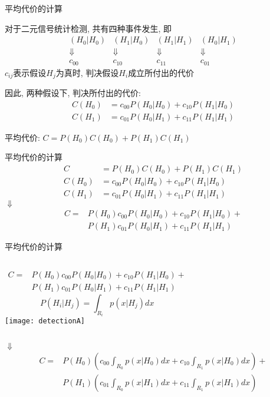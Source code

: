 \begin{frame}{平均代价的计算}
\begin{block}{对于二元信号统计检测, 共有四种事件发生, 即}
	$$
	\begin{array}{cccc}
	(H_0|H_0) & (H_1|H_0) & (H_1|H_1) & (H_0|H_1)\\
	\Downarrow & \Downarrow & \Downarrow & \Downarrow\\
	c_{00} & c_{10} & c_{11} & c_{01}
	\end{array}
	$$
	$c_{ij}$表示假设$H_j$为真时, 判决假设$H_i$成立所付出的代价
\end{block}
\begin{block}{因此, 两种假设下, 判决所付出的代价: }
   \begin{align*}
   C(H_0)&=c_{00}P(H_0|H_0)+c_{10}P(H_1|H_0)\\
   C(H_1)&=c_{01}P(H_0|H_1)+c_{11}P(H_1|H_1)
   \end{align*}
\end{block}
 平均代价: $C=P(H_0)C(H_0)+P(H_1)C(H_1)$
\end{frame}

\begin{frame}{平均代价的计算}
\begin{align*}
C&=P(H_0)C(H_0)+P(H_1)C(H_1)\\
C(H_0)&=c_{00}P(H_0|H_0)+c_{10}P(H_1|H_0)\\
C(H_1)&=c_{01}P(H_0|H_1)+c_{11}P(H_1|H_1)
\end{align*}
\centering $\Downarrow$
\begin{align*}
C=&P(H_0)c_{00}P(H_0|H_0)+c_{10}P(H_1|H_0)+\\
&P(H_1)c_{01}P(H_0|H_1)+c_{11}P(H_1|H_1)
\end{align*}
\end{frame}

\begin{frame}[shrink]{平均代价的计算}
\begin{columns}
	\begin{align*}
	C=&P(H_0)c_{00}P(H_0|H_0)+c_{10}P(H_1|H_0)+\\
	&P(H_1)c_{01}P(H_0|H_1)+c_{11}P(H_1|H_1)
	\end{align*}
	\[ P(H_i|H_j)=\int_{R_i}p(x|H_j)dx\]
	\texttt{[image: detectionA]}
\end{columns}

\medskip
\centering $\Downarrow$
\begin{align*}
C=&P(H_0)\left(c_{00}\int_{R_0}p(x|H_0)dx+c_{10}\int_{R_1}p(x|H_0)dx\right)+\\
&P(H_1)\left(c_{01}\int_{R_0}p(x|H_1)dx+c_{11}\int_{R_1}p(x|H_1)dx\right)
\end{align*}

\end{frame}

